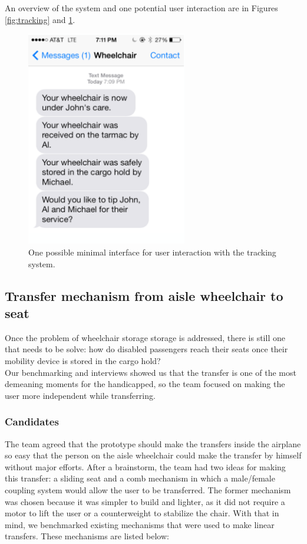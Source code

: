 An overview of the system and one potential user interaction are in Figures \ref{fig:tracking} and \ref{fig:tips}.


\begin{figure}[h]
  \centering
     \includegraphics[width=7cm]{images/tips.png}
   \caption{One possible minimal interface for user interaction with the tracking system.}
  \label{fig:tips}
\end{figure}


\subsection{Transfer mechanism from aisle wheelchair to seat}

Once the problem of wheelchair storage storage is addressed, there is still one that needs to be solve: how do disabled passengers reach their seats once their mobility device is stored in the cargo hold? \\

Our benchmarking and interviews showed us that the transfer is one of the most demeaning moments for the handicapped, so the team focused on making the user more independent while transferring. \\

\subsubsection{Candidates}
The team agreed that the prototype should make the transfers inside the airplane so easy that the person on the aisle wheelchair could make the transfer by himself without major efforts. After a brainstorm, the team had two ideas for making this transfer: a sliding seat and a comb mechanism in which a male/female coupling system would allow the user to be transferred. The former mechanism was chosen because it was simpler to build and lighter, as it did not require a motor to lift the user or a counterweight to stabilize the chair. With that in mind, we benchmarked existing mechanisms that were used to make linear transfers. These mechanisms are listed below: \\

